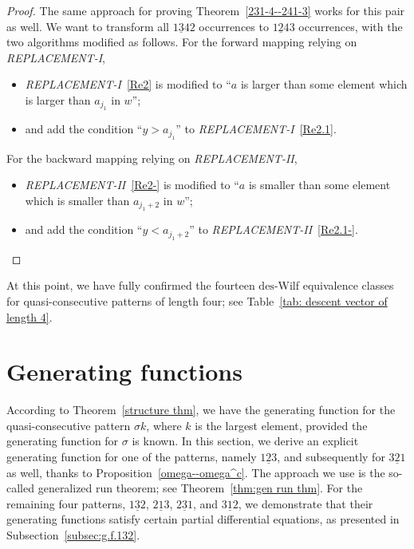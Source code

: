 \documentclass[11pt,reqno]{amsart}
\numberwithin{equation}{section}
\theoremstyle{plain}
\theoremstyle{definition}
\def\des{\mathrm{des}}
\begin{document}
\begin{proof}
  The same approach for proving Theorem~\ref{231-4--241-3} works for this pair as well. We want to transform all $\underline{134}2$ occurrences to $\underline{124}3$ occurrences, with the two algorithms modified as follows. For the forward mapping relying on \textit{REPLACEMENT-I},
  \begin{itemize}
      \item  \textit{REPLACEMENT-I}~\ref{Re2} is modified to ``$a$ is larger than some element which is larger than $a_{j_1}$ in $w$'';
      \item  and add the condition ``$y>a_{j_1}$'' to \textit{REPLACEMENT-I}~\ref{Re2.1}. 
  \end{itemize}
  For the backward mapping relying on \textit{REPLACEMENT-II}, 
  \begin{itemize}
      \item \textit{REPLACEMENT-II}~\ref{Re2-} is modified to ``$a$ is smaller than some element which is smaller than $a_{j_1+2}$ in $w$'';
      \item  and add the condition ``$y<a_{j_1+2}$'' to \textit{REPLACEMENT-II}~\ref{Re2.1-}. \qedhere
  \end{itemize}
\end{proof}

At this point, we have fully confirmed the fourteen $\des$-Wilf equivalence classes for quasi-consecutive patterns of length four; see Table~\ref{tab: descent vector of length 4}.

\section{Generating functions} \label{sec:g.f. of 4}

According to Theorem~\ref{structure thm}, we have the generating function for the quasi-consecutive pattern $\sigma k$, where $k$ is the largest element, provided the generating function for $\sigma$ is known. In this section, we derive an explicit generating function for one of the patterns, namely $\underline{123}$, and subsequently for $\underline{321}$ as well, thanks to Proposition~\ref{omega--omega^c}. The approach we use is the so-called generalized run theorem; see Theorem~\ref{thm:gen run thm}. For the remaining four patterns, $\underline{132}$, $\underline{213}$, $\underline{231}$, and $\underline{312}$, we demonstrate that their generating functions satisfy certain partial differential equations, as presented in Subsection~\ref{subsec:g.f.132}.
\end{document}
